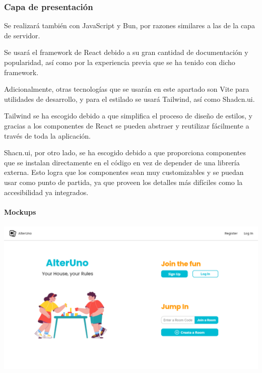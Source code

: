 \subsubsection{Capa de presentación}

Se realizará también con JavaScript y Bun, por razones similares a las de la capa de servidor. 

Se usará el framework de React debido a su gran cantidad de documentación y popularidad,
así como por la experiencia previa que se ha tenido con dicho framework. 

Adicionalmente, otras tecnologías que se usarán en este apartado son Vite para
utilidades de desarrollo, y para el estilado se usará Tailwind, así como Shadcn.ui.

Tailwind se ha escogido debido a que simplifica el proceso de diseño de estilos,
y gracias a los componentes de React se pueden abstraer y reutilizar fácilmente
a través de toda la aplicación. 

Shacn.ui, por otro lado, se ha escogido debido a que proporciona componentes
que se instalan directamente en el código en vez de depender de una librería externa.
Esto logra que los componentes sean muy customizables y se puedan usar como punto de partida,
ya que proveen los detalles más difíciles como la accesibilidad ya integrados.

\paragraph{Mockups}

\begin{center}
  \includegraphics[width=1\textwidth]{img/Mockup Main Page}
   \label{fig:mainmockup}
\end{center}

